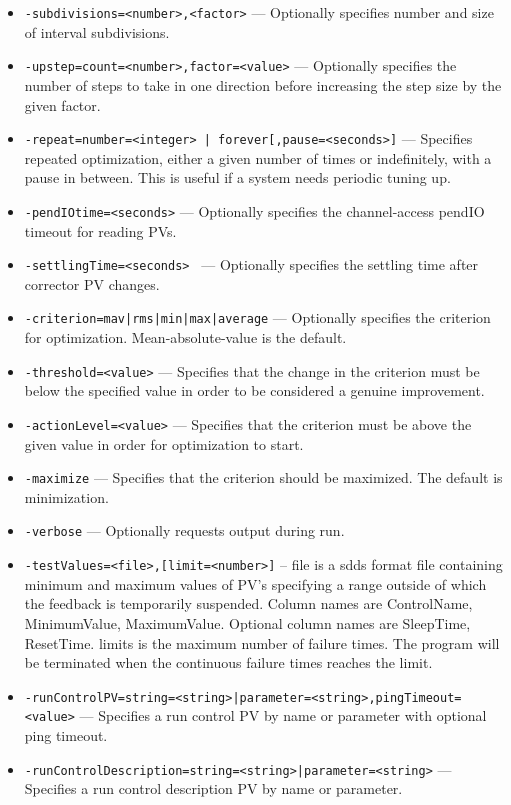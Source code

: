 \begin{itemize}
\begin{itemize}
        \item {\tt -subdivisions=<number>,<factor>} --- Optionally specifies number and size of interval
                     subdivisions.
        \item {\tt -upstep=count=<number>,factor=<value>} --- Optionally specifies the number of steps
                to take in one direction before increasing the step size by the given factor.
        \item {\tt -repeat={number=<integer> | forever}[,pause=<seconds>]} --- Specifies repeated
                optimization, either a given number of times or indefinitely, with a pause in between.
                This is useful if a system needs periodic tuning up.
        \item {\tt -pendIOtime=<seconds>} --- Optionally specifies the channel-access pendIO timeout for reading PVs.
        \item {\tt -settlingTime=<seconds> } --- Optionally specifies the settling time after corrector PV changes.
        \item {\tt -criterion={mav|rms|min|max|average}} --- Optionally specifies the criterion for optimization.
                Mean-absolute-value is the default.
        \item {\tt -threshold=<value>} --- Specifies that the change in the criterion must be below the specified
        value in order to be considered a genuine improvement.
        \item {\tt -actionLevel=<value>} --- Specifies that the criterion must be above the given value
        in order for optimization to start.
        \item {\tt -maximize} --- Specifies that the criterion should be maximized.  The default is
                minimization.
        \item {\tt -verbose} --- Optionally requests output during run.
        \item {\tt -testValues=<file>,[limit=<number>]} --
                     file is a sdds format file containing minimum and maximum values
                     of PV's specifying a range outside of which the feedback
                     is temporarily suspended. Column names are ControlName,
                     MinimumValue, MaximumValue. Optional column names are
                     SleepTime, ResetTime.
                     limits is the maximum number of failure times. The program will be
                     terminated when the continuous failure times reaches the limit.
        \item {\tt -runControlPV={string=<string>|parameter=<string>},pingTimeout=<value>} ---
                    Specifies a run control PV by name or parameter with optional ping timeout.
        \item {\tt -runControlDescription={string=<string>|parameter=<string>}} ---
                    Specifies a run control description PV by name or parameter.
    \end{itemize}


\end{itemize}
